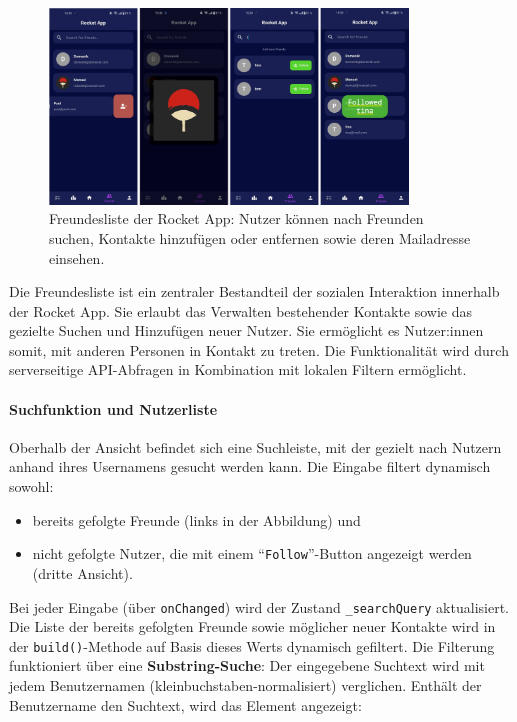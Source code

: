 \documentclass[11pt,a4paper]{article}
\begin{document}
\begin{figure}[H]
    \centering
    \includegraphics[width=0.85\textwidth]{images/apps/friendlist-pages.jpg}
    \caption{Freundesliste der Rocket App: Nutzer können nach Freunden suchen, Kontakte hinzufügen oder entfernen sowie deren Mailadresse einsehen.}
    \label{fig:validation-workflow}
\end{figure}


Die Freundesliste ist ein zentraler Bestandteil der sozialen Interaktion innerhalb der Rocket App. Sie erlaubt das Verwalten bestehender Kontakte sowie das gezielte Suchen und Hinzufügen neuer Nutzer.
Sie ermöglicht es Nutzer:innen somit, mit anderen Personen in Kontakt zu treten. Die Funktionalität wird durch serverseitige API-Abfragen in Kombination mit lokalen Filtern ermöglicht.

\paragraph{Suchfunktion und Nutzerliste}
Oberhalb der Ansicht befindet sich eine Suchleiste, mit der gezielt nach Nutzern anhand ihres Usernamens gesucht werden kann. Die Eingabe filtert dynamisch sowohl:
\begin{itemize}
    \item bereits gefolgte Freunde (links in der Abbildung) und
    \item nicht gefolgte Nutzer, die mit einem ``\texttt{Follow}''-Button angezeigt werden (dritte Ansicht).
\end{itemize}

Bei jeder Eingabe (über \texttt{onChanged}) wird der Zustand \texttt{\_searchQuery} aktualisiert. Die Liste der bereits gefolgten Freunde sowie möglicher neuer Kontakte wird in der \texttt{build()}-Methode auf Basis dieses Werts dynamisch gefiltert. Die Filterung funktioniert über eine \textbf{Substring-Suche}: Der eingegebene Suchtext wird mit jedem Benutzernamen (kleinbuchstaben-normalisiert) verglichen. Enthält der Benutzername den Suchtext, wird das Element angezeigt:
\end{document}
